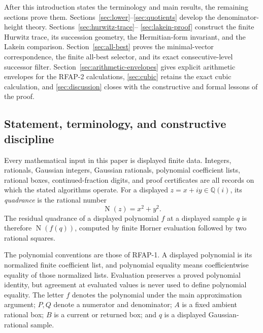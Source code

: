 \documentclass[11pt]{article}
\newcommand{\Qi}{\mathbb{Q}(i)}
\newcommand{\Norm}[1]{\operatorname{N}\!\left(#1\right)}
\begin{document}
After this introduction states the terminology and main results, the
remaining sections prove them.  Sections~\ref{sec:lower}--\ref{sec:quotients}
develop the denominator-height theory.  Sections~\ref{sec:hurwitz-trace}--
\ref{sec:lakein-proof} construct the finite Hurwitz trace, its succession
geometry, the Hermitian-form invariant, and the Lakein comparison.
Section~\ref{sec:all-best} proves the minimal-vector correspondence, the
finite all-best selector, and its exact consecutive-level successor filter.
Section~\ref{sec:arithmetic-envelopes} gives explicit arithmetic envelopes
for the RFAP-2 calculations, \cref{sec:cubic} retains the exact cubic
calculation, and
\cref{sec:discussion} closes with the constructive and formal lessons of the
proof.

\subsection{Statement, terminology, and constructive discipline}
\label{sec:discipline}

Every mathematical input in this paper is displayed finite data.  Integers,
rationals, Gaussian integers, Gaussian rationals, polynomial coefficient
lists, rational boxes, continued-fraction digits, and proof certificates are
all records on which the stated algorithms operate.  For a displayed
$z=x+iy\in\Qi$, its \emph{quadrance} is the rational number
\begin{equation}
\label{eq:quadrance}
                         \Norm z=x^2+y^2.
\end{equation}
The residual quadrance of a displayed polynomial $f$ at a displayed sample
$q$ is therefore $\Norm{f(q)}$, computed by finite Horner evaluation followed
by two rational squares.

The polynomial conventions are those of RFAP-1.  A displayed polynomial is
its normalized finite coefficient list, and polynomial equality means
coefficientwise equality of those normalized lists.  Evaluation preserves a
proved polynomial identity, but agreement at evaluated values is never used
to define polynomial equality.  The letter $f$ denotes the polynomial under
the main approximation argument; $P,Q$ denote a numerator and denominator;
$A$ is a fixed ambient rational box; $B$ is a current or returned box; and
$q$ is a displayed Gaussian-rational sample.
\end{document}
